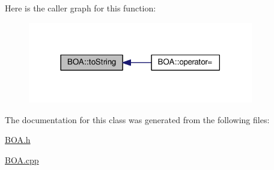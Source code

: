 Here is the caller graph for this function\+:\nopagebreak
\begin{figure}[H]
\begin{center}
\leavevmode
\includegraphics[width=278pt]{class_b_o_a_a348df0299997f81bcad0ec034dab0b8d_icgraph}
\end{center}
\end{figure}




The documentation for this class was generated from the following files\+:\begin{DoxyCompactItemize}
\item 
\hyperlink{_b_o_a_8h}{B\+O\+A.\+h}\item 
\hyperlink{_b_o_a_8cpp}{B\+O\+A.\+cpp}\end{DoxyCompactItemize}
